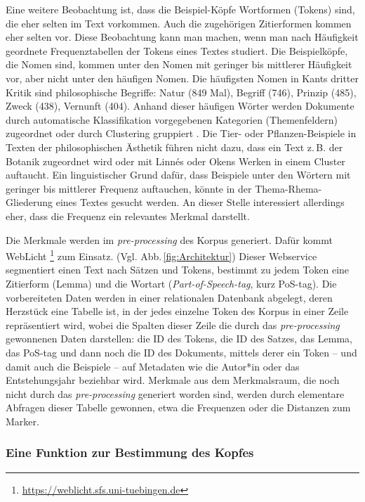 \documentclass{article}
\newcommand*{\englisch}[1]{\foreignlanguage{english}{\textit{#1}}}%
\begin{document}
Eine weitere Beobachtung ist, dass die Beispiel-Köpfe Wortformen
(Tokens) sind, die eher selten im Text vorkommen. Auch die zugehörigen
Zitierformen kommen eher selten vor. Diese Beobachtung kann man
machen, wenn man nach Häufigkeit geordnete Frequenztabellen der Tokens
eines Textes studiert. Die Beispielköpfe, die Nomen sind, kommen unter
den Nomen mit geringer bis mittlerer Häufigkeit vor, aber nicht unter
den häufigen Nomen. Die häufigsten Nomen in Kants dritter Kritik sind
philosophische Begriffe: Natur (849 Mal), Begriff (746), Prinzip
(485), Zweck (438), Vernunft (404). Anhand dieser häufigen Wörter
werden Dokumente durch automatische Klassifikation vorgegebenen
Kategorien (Themenfeldern) zugeordnet \parencite{Sebastiani2002a} oder
durch Clustering gruppiert \parencite[195--209]{Heyer2006a}. Die Tier-
oder Pflanzen-Beispiele in Texten der philosophischen Ästhetik führen
nicht dazu, dass ein Text z.\,B. der Botanik zugeordnet wird oder mit
Linnés oder Okens Werken in einem Cluster auftaucht. Ein
linguistischer Grund dafür, dass Beispiele unter den Wörtern mit
geringer bis mittlerer Frequenz auftauchen, könnte in der
Thema-Rhema-Gliederung eines Textes gesucht
werden. \Parencite[784-786]{Bussm1990} An dieser Stelle interessiert
allerdings eher, dass die Frequenz ein relevantes Merkmal darstellt.

Die Merkmale werden im \englisch{pre-processing} des Korpus
generiert. Dafür kommt WebLicht%
\footnote{\url{https://weblicht.sfs.uni-tuebingen.de}} %
zum Einsatz. (Vgl. Abb.\,\ref{fig:Architektur}) Dieser Webservice
segmentiert einen Text nach Sätzen und Tokens, bestimmt zu jedem Token
eine Zitierform (Lemma) und die Wortart
(\englisch{Part-of-Speech-tag}, kurz PoS-tag). Die vorbereiteten Daten
werden in einer relationalen Datenbank abgelegt, deren Herzstück eine
Tabelle ist, in der jedes einzelne Token des Korpus in einer Zeile
repräsentiert wird, wobei die Spalten dieser Zeile die durch das
\englisch{pre-processing} gewonnenen Daten darstellen: die ID des
Tokens, die ID des Satzes, das Lemma, das PoS-tag und dann noch die ID
des Dokuments, mittels derer ein Token -- und damit auch die Beispiele
-- auf Metadaten wie die Autor*in oder das Entstehungsjahr beziehbar
wird. Merkmale aus dem Merkmalsraum, die noch nicht durch das
\englisch{pre-processing} generiert worden sind, werden durch
elementare Abfragen dieser Tabelle gewonnen, etwa die Frequenzen oder
die Distanzen zum Marker.


\subsubsection{Eine Funktion zur Bestimmung des Kopfes}
\end{document}
